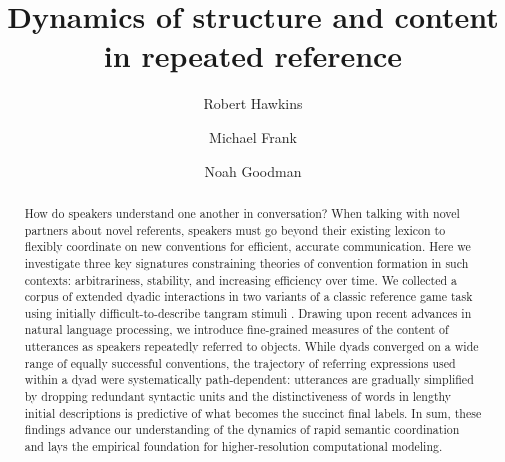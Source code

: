 \documentclass[alpha-refs]{wiley-article}
\title{Dynamics of structure and content in repeated reference}
\author[1]{Robert Hawkins}
\author[1]{Michael Frank}
\author[1,2]{Noah Goodman}
\affil[1]{Department of Psychology, Stanford University}
\affil[2]{Department of Computer Science, Stanford University}
\begin{document}
\maketitle








\begin{abstract}
How do speakers understand one another in conversation? 
When talking with novel partners about novel referents, speakers must go beyond their existing lexicon to flexibly coordinate on new conventions for efficient, accurate communication.
Here we investigate three key signatures constraining theories of convention formation in such contexts: arbitrariness, stability, and increasing efficiency over time. 
We collected a corpus of extended dyadic interactions in two variants of a classic reference game task using  initially difficult-to-describe tangram stimuli . 
Drawing upon recent advances in natural language processing, we introduce fine-grained measures of the content of utterances as speakers repeatedly referred to objects.
While dyads converged on a wide range of equally successful conventions, the trajectory of referring expressions used within a dyad were systematically path-dependent: 
utterances are gradually simplified by dropping redundant syntactic units and
the distinctiveness of words in lengthy initial descriptions is predictive of what becomes the succinct final labels.
In sum, these findings advance our understanding of the dynamics of rapid semantic coordination and lays the empirical foundation for higher-resolution computational modeling.

\end{abstract}
\end{document}
